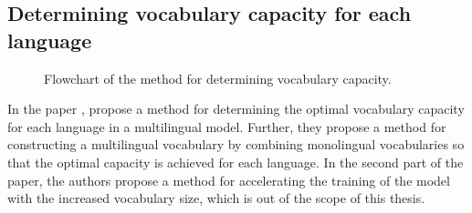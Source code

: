 
\subsection{Determining vocabulary capacity for each language}
\label{sec:zheng}

\begin{figure}[ht]
    \centering
    \caption{Flowchart of the \citeauthor{zheng_allocating_2021} method for determining vocabulary capacity.}
    \label{fig:zheng_flowchart}
\end{figure}

In the paper , \citeauthor{zheng_allocating_2021} propose a method for determining the optimal vocabulary capacity for each language in a multilingual model. Further, they propose a method for constructing a multilingual vocabulary by combining monolingual vocabularies so that the optimal capacity is achieved for each language. In the second part of the paper, the authors propose a method for accelerating the training of the model with the increased vocabulary size, which is out of the scope of this thesis.



